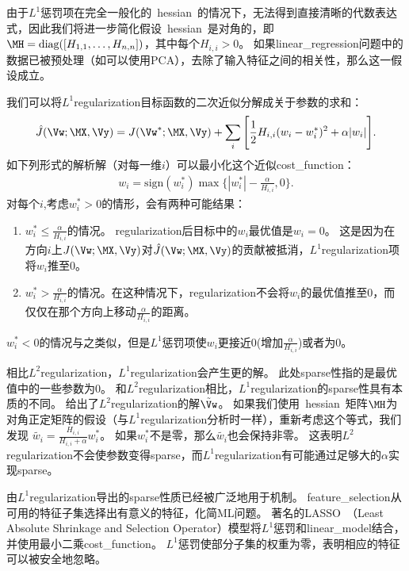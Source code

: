 由于$L^1$惩罚项在完全一般化的~\gls{hessian}~的情况下，无法得到直接清晰的代数表达式，因此我们将进一步简化假设~\gls{hessian}~是对角的，即$\MH = \text{diag}([H_{1,1},\dots, H_{n,n}])$，其中每个$H_{i,i}>0$。
如果\gls{linear_regression}问题中的数据已被预处理（如可以使用PCA），去除了输入特征之间的相关性，那么这一假设成立。

我们可以将$L^1$\gls{regularization}目标函数的二次近似分解成关于参数的求和：
\begin{align}
 \hat J(\Vw; \MX, \Vy) = J(\Vw^*; \MX, \Vy) + \sum_i \Bigg [\frac{1}{2} H_{i,i} (w_i - w_i^*)^2 
 + \alpha |w_i| \Bigg].  %
\end{align}
如下列形式的解析解（对每一维$i$）可以最小化这个近似\gls{cost_function}：
\begin{align}
w_i = \text{sign}(w_i^*) \max\Big\{ |w_i^*| - \frac{\alpha}{H_{i,i}} , 0\Big\} .
\end{align}
对每个$i$,考虑$w_i^* > 0$的情形，会有两种可能结果：
\begin{enumerate}
\item $w_i^* \leq \frac{\alpha}{H_{i,i}}$的情况。
\gls{regularization}后目标中的$w_i$最优值是$w_i = 0$。
这是因为在方向$i$上$J(\Vw; \MX, \Vy) $对$ \hat J(\Vw; \MX, \Vy)$的贡献被抵消，$L^1$\gls{regularization}项将$w_i$推至$0$。
\item  $w_i^* > \frac{\alpha}{H_{i,i}}$的情况。在这种情况下，\gls{regularization}不会将$w_i$的最优值推至0，而仅仅在那个方向上移动$\frac{\alpha}{H_{i,i}}$的距离。
\end{enumerate}
$w_i^* < 0$的情况与之类似，但是$L^1$惩罚项使$w_i$更接近0(增加$ \frac{\alpha}{H_{i,i}}$)或者为0。

相比$L^2$\gls{regularization}，$L^1$\gls{regularization}会产生更的解。
此处\gls{sparse}性指的是最优值中的一些参数为$0$。
和$L^2$\gls{regularization}相比，$L^1$\gls{regularization}的\gls{sparse}性具有本质的不同。
给出了$L^2$\gls{regularization}的解$\tilde \Vw$。 
如果我们使用~\gls{hessian}~矩阵$\MH$为对角正定矩阵的假设（与$L^1$\gls{regularization}分析时一样），重新考虑这个等式，我们发现
$\tilde{w_i} = \frac{H_{i,i}}{H_{i,i} + \alpha} w_i^*$。
如果$w_i^*$不是零，那么$\tilde{w_i}$也会保持非零。 
这表明$L^2$\gls{regularization}不会使参数变得\gls{sparse}，而$L^1$\gls{regularization}有可能通过足够大的$\alpha$实现\gls{sparse}。
 
由$L^1$\gls{regularization}导出的\gls{sparse}性质已经被广泛地用于机制。
\gls{feature_selection}从可用的特征子集选择出有意义的特征，化简\gls{ML}问题。
著名的LASSO~\citep{Tibshirani95}（Least Absolute Shrinkage and
Selection Operator）模型将$L^1$惩罚和\gls{linear_model}结合，并使用最小二乘\gls{cost_function}。 
$L^1$惩罚使部分子集的权重为零，表明相应的特征可以被安全地忽略。
 
